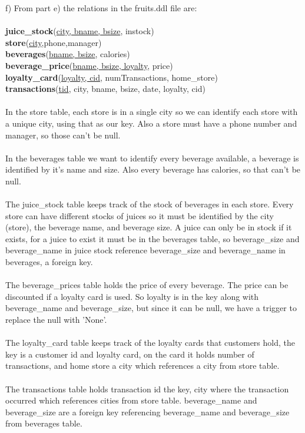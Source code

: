 \documentclass{article}
\begin{document}
\begin{enumerate}
	f) From part e) the relations in the fruits.ddl file are:\\\\
	\textbf{juice\_stock}(\underline{city, bname, bsize}, instock)\\
		 \textbf{store}(\underline{city},phone,manager)\\
		 \textbf{beverages}(\underline{bname, bsize}, calories)\\
		 \textbf{beverage\_price}(\underline{bname, bsize, loyalty}, price)\\
		 \textbf{loyalty\_card}(\underline{loyalty, cid}, numTransactions, home\_store)\\
		 \textbf{transactions}(\underline{tid}, city, bname, bsize, date, loyalty, cid)\\\\
		 In the store table, each store is in a single city so we can identify each store with a unique city, using that as our key. Also a store must have a phone number and manager, so those can't be null.\\\\
		 In the beverages table we want to identify every beverage available, a beverage is identified by it's name and size. Also every beverage has calories, so that can't be null.\\\\
		 The juice\_stock table keeps track of the stock of beverages in each store. 
		 Every store can have different stocks of juices so it must be identified by the city (store), the beverage name, and beverage size. A juice can only be in stock if it exists, for a juice to exist it must be in the beverages table, so beverage\_size and beverage\_name in juice stock reference beverage\_size and beverage\_name in beverages, a foreign key.\\\\
		 The beverage\_prices table holds the price of every beverage. The price can be discounted if a loyalty card is used. So loyalty is in the key along with beverage\_name and beverage\_size, but since it can be null, we have a trigger to replace the null with 'None'. \\\\
		 The loyalty\_card table keeps track of the loyalty cards that customers hold, the key is a customer id and loyalty card, on the card it holds number of transactions, and home store a city which references a city from store table.\\\\
		 The transactions table holds transaction id the key, city where the transaction occurred which references cities from store table. beverage\_name and beverage\_size are a foreign key referencing  beverage\_name and beverage\_size from beverages table.
		 
	
		
	
       

\end{enumerate}
\end{document}
